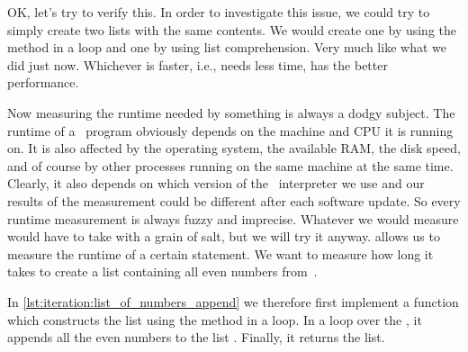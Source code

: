 %
%
%
%
%

OK, let's try to verify this.
In order to investigate this issue, we could try to simply create two lists with the same contents.
We would create one by using the  method in a loop and one by using list comprehension.
Very much like what we did just now.
Whichever is faster, i.e., needs less time, has the better performance.

Now measuring the runtime needed by something is always a dodgy subject.
The runtime of a \python\ program obviously depends on the machine and CPU it is running on.
It is also affected by the operating system, the available RAM, the disk speed, and of course by other processes running on the same machine at the same time.
Clearly, it also depends on which version of the \python\ interpreter we use and our results of the measurement could be different after each software update.
So every runtime measurement is always fuzzy and imprecise.
Whatever we would measure would have to take with a grain of salt, but we will try it anyway.%
%
%
%
 allows us to measure the runtime of a certain statement.
We want to measure how long it takes to create a list containing all even numbers from~.

In \cref{lst:iteration:list_of_numbers_append} we therefore first implement a function  which constructs the list using the  method in a loop.
In a loop over the , it appends all the even numbers to the list .
Finally, it returns the list.

